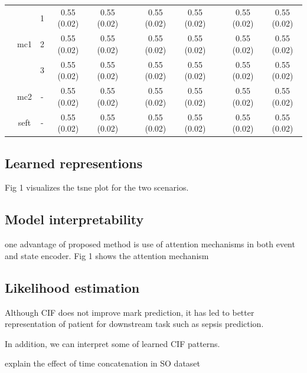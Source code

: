 \documentclass[journal,twoside,web]{ieeecolor}
\begin{document}
\begin{table}[htbp]
\begin{tabular}{ccccccccccc}
  \cmidrule{2-11}          & \multirow{3}[2]{*}{mc1} & 1     & 0.55 (0.02) & 0.55 (0.02) &       & 0.55 (0.02) & 0.55 (0.02) &       & 0.55 (0.02) & 0.55 (0.02) \\
            &       & 2     & 0.55 (0.02) & 0.55 (0.02) &       & 0.55 (0.02) & 0.55 (0.02) &       & 0.55 (0.02) & 0.55 (0.02) \\
            &       & 3     & 0.55 (0.02) & 0.55 (0.02) &       & 0.55 (0.02) & 0.55 (0.02) &       & 0.55 (0.02) & 0.55 (0.02) \\
  \cmidrule{2-11}          & mc2   & -     & 0.55 (0.02) & 0.55 (0.02) &       & 0.55 (0.02) & 0.55 (0.02) &       & 0.55 (0.02) & 0.55 (0.02) \\
            & seft  & -     & 0.55 (0.02) & 0.55 (0.02) &       & 0.55 (0.02) & 0.55 (0.02) &       & 0.55 (0.02) & 0.55 (0.02) \\
      \bottomrule
      \end{tabular}%
    \label{tab:addlabel}%
  \end{table}%
  
  
  
  








\subsection{Learned representions}
Fig 1 visualizes the tsne plot for the two scenarios.


\subsection{Model interpretability}

one advantage of proposed method is use of attention mechanisms in both event and state encoder.
Fig 1 shows the attention mechanism



\subsection{Likelihood estimation}

Although CIF does not improve mark prediction, it has led to better representation of patient for downstream task such as sepsis prediction.

In addition, we can interpret some of learned CIF patterns.

explain the effect of time concatenation in SO dataset
\end{document}

